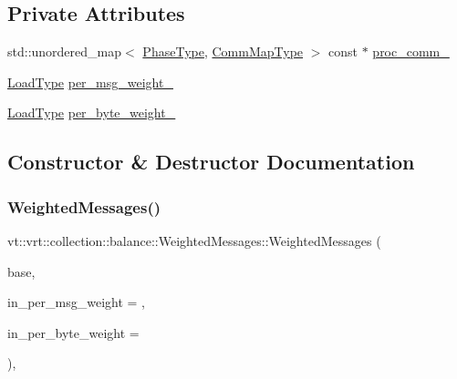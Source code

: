 \subsection*{Private Attributes}
\begin{DoxyCompactItemize}
\item 
std\+::unordered\+\_\+map$<$ \hyperlink{namespacevt_a46ce6733d5cdbd735d561b7b4029f6d7}{Phase\+Type}, \hyperlink{namespacevt_1_1vrt_1_1collection_1_1balance_a01ee1fb0ae2da1d2ab7fdca3be9ae351}{Comm\+Map\+Type} $>$ const  $\ast$ \hyperlink{structvt_1_1vrt_1_1collection_1_1balance_1_1_weighted_messages_a00eed5357188d150d0726e98b683711e}{proc\+\_\+comm\+\_\+}
\item 
\hyperlink{namespacevt_a8fb51741340b87d7aaee0bef60e9896b}{Load\+Type} \hyperlink{structvt_1_1vrt_1_1collection_1_1balance_1_1_weighted_messages_adc30d244fadec3ef555fc2829c3fc59b}{per\+\_\+msg\+\_\+weight\+\_\+}
\item 
\hyperlink{namespacevt_a8fb51741340b87d7aaee0bef60e9896b}{Load\+Type} \hyperlink{structvt_1_1vrt_1_1collection_1_1balance_1_1_weighted_messages_a23b15544d4d51fa8613dad5727c52732}{per\+\_\+byte\+\_\+weight\+\_\+}
\end{DoxyCompactItemize}


\subsection{Constructor \& Destructor Documentation}
\mbox{\label{structvt_1_1vrt_1_1collection_1_1balance_1_1_weighted_messages_a702340c1de974e4e616057a776b903d6}} 
\subsubsection{\texorpdfstring{Weighted\+Messages()}{WeightedMessages()}}
{\footnotesize\ttfamily vt\+::vrt\+::collection\+::balance\+::\+Weighted\+Messages\+::\+Weighted\+Messages (\begin{DoxyParamCaption}\item[{std\+::shared\+\_\+ptr$<$ \hyperlink{structvt_1_1vrt_1_1collection_1_1balance_1_1_load_model}{balance\+::\+Load\+Model} $>$}]{base,  }\item[{\hyperlink{namespacevt_a8fb51741340b87d7aaee0bef60e9896b}{Load\+Type}}]{in\+\_\+per\+\_\+msg\+\_\+weight = {},  }\item[{\hyperlink{namespacevt_a8fb51741340b87d7aaee0bef60e9896b}{Load\+Type}}]{in\+\_\+per\+\_\+byte\+\_\+weight = {} }\end{DoxyParamCaption})\hspace{0.3cm}{\ttfamily [inline]}, {\ttfamily [explicit]}}



